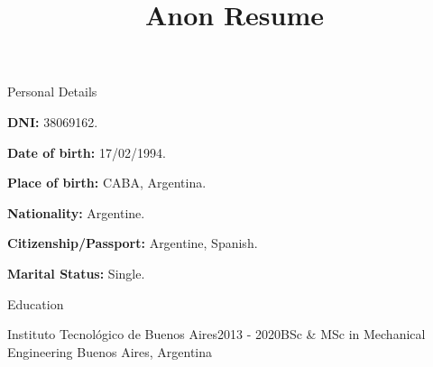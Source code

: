 \documentclass{resume} %
\begin{document}
\title{Anon Resume}

\begin{rSection}{Personal Details}

\vspace{-3.5mm}
    \begin{itemize}
        \setlength{\itemsep}{3pt}
        \setlength{\parskip}{0pt}
        \setlength{\parsep}{0pt}
        \begin{multicols}{2}
        \item \textbf{DNI:} 38069162.
        \item \textbf{Date of birth:} 17/02/1994.
        \item \textbf{Place of birth:} CABA, Argentina.
        \item \textbf{Nationality:} Argentine.
        \item \textbf{Citizenship/Passport:} Argentine, Spanish.
        \item \textbf{Marital Status:} Single.
\end{multicols}
\end{itemize}
\vspace{-1mm}
\end{rSection}


\begin{rSection}{Education}

\begin{rSubsection}{Instituto Tecnológico de Buenos Aires}{2013 - 2020}{BSc \& MSc in Mechanical Engineering }{Buenos Aires, Argentina}
\vspace{-.65cm}
\item[]
\end{rSubsection}
\end{rSection}
\end{document}
